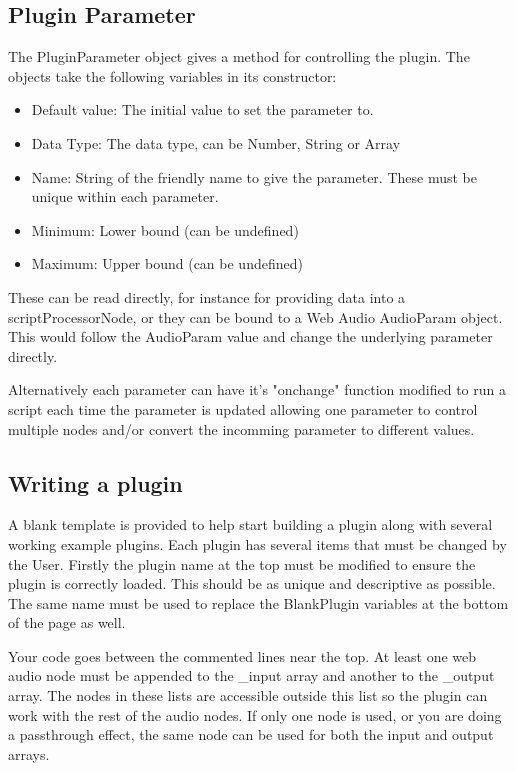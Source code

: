 \documentclass{article}
\begin{document}
\subsection{Plugin Parameter}
\label{sec:PluginParameter}

The PluginParameter object gives a method for controlling the plugin. The objects take the following variables in its constructor:
\begin{itemize}
\item Default value: The initial value to set the parameter to.
\item Data Type: The data type, can be Number, String or Array
\item Name: String of the friendly name to give the parameter. These must be unique within each parameter.
\item Minimum: Lower bound (can be undefined)
\item Maximum: Upper bound (can be undefined)
\end{itemize}

These can be read directly, for instance for providing data into a scriptProcessorNode, or they can be bound to a Web Audio AudioParam object. This would follow the AudioParam value and change the underlying parameter directly.

Alternatively each parameter can have it's "onchange" function modified to run a script each time the parameter is updated allowing one parameter to control multiple nodes and/or convert the incomming parameter to different values.

\subsection{Writing a plugin}

A blank template is provided to help start building a plugin along with several working example plugins. Each plugin has several items that must be changed by the User. Firstly the plugin name at the top must be modified to ensure the plugin is correctly loaded. This should be as unique and descriptive as possible. The same name must be used to replace the BlankPlugin variables at the bottom of the page as well.

Your code goes between the commented lines near the top. At least one web audio node must be appended to the \_input array and another to the \_output array. The nodes in these lists are accessible outside this list so the plugin can work with the rest of the audio nodes. If only one node is used, or you are doing a passthrough effect, the same node can be used for both the input and output arrays.
\end{document}
